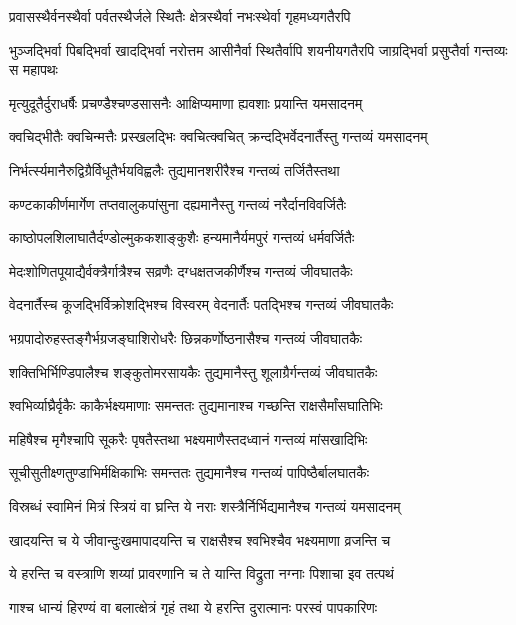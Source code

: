 \twolineshloka
{प्रवासस्थैर्वनस्थैर्वा पर्वतस्थैर्जले स्थितैः}
{क्षेत्रस्थैर्वा नभःस्थेर्वा गृहमध्यगतैरपि}


\threelineshloka
{भुञ्जद्भिर्वा पिबद्भिर्वा खादद्भिर्वा नरोत्तम}
{आसीनैर्वा स्थितैर्वापि शयनीयगतैरपि}
{जाग्रद्भिर्वा प्रसुप्तैर्वा गन्तव्यः स महापथः}


\twolineshloka
{मृत्युदूतैर्दुराधर्षैः प्रचण्डैश्चण्डसासनैः}
{आक्षिप्यमाणा ह्यवशाः प्रयान्ति यमसादनम्}


\twolineshloka
{क्वचिद्भीतैः क्वचिन्मत्तैः प्रस्खलद्भिः क्वचित्क्वचित्}
{क्रन्दद्भिर्वेदनार्तैस्तु गन्तव्यं यमसादनम्}


\twolineshloka
{निर्भर्त्स्यमानैरुद्विग्रैर्विधूतैर्भयविह्वलैः}
{तुद्यमानशरीरैश्च गन्तव्यं तर्जितैस्तथा}


\twolineshloka
{कण्टकाकीर्णमार्गेण तप्तवालुकपांसुना}
{दह्यमानैस्तु गन्तव्यं नरैर्दानविवर्जितैः}


\twolineshloka
{काष्ठोपलशिलाघातैर्दण्डोल्मुककशाङ्कुशैः}
{हन्यमानैर्यमपुरं गन्तव्यं धर्मवर्जितैः}


\twolineshloka
{मेदःशोणितपूयाद्यैर्वक्त्रैर्गात्रैश्च सव्रणैः}
{दग्धक्षतजकीर्णैश्च गन्तव्यं जीवघातकैः}


\twolineshloka
{वेदनार्तैस्च कूजद्भिर्विक्रोशद्भिश्च विस्वरम्}
{वेदनार्तैः पतद्भिश्च गन्तव्यं जीवघातकैः}


\twolineshloka
{भग्रपादोरुहस्तङ्गैर्भग्रजङ्घाशिरोधरैः}
{छिन्नकर्णोष्ठनासैश्च गन्तव्यं जीवघातकैः}


\twolineshloka
{शक्तिभिर्भिण्डिपालैश्च शङ्कुतोमरसायकैः}
{तुद्यमानैस्तु शूलाग्रैर्गन्तव्यं जीवघातकैः}


\twolineshloka
{श्वभिर्व्याघ्रैर्वृकैः काकैर्भक्ष्यमाणाः समन्ततः}
{तुद्यमानाश्च गच्छन्ति राक्षसैर्मांसघातिभिः}


\twolineshloka
{महिषैश्च मृगैश्चापि सूकरैः पृषतैस्तथा}
{भक्ष्यमाणैस्तदध्वानं गन्तव्यं मांसखादिभिः}


\twolineshloka
{सूचीसुतीक्ष्णतुण्डाभिर्मक्षिकाभिः समन्ततः}
{तुद्यमानैश्च गन्तव्यं पापिष्ठैर्बालघातकैः}


\twolineshloka
{विस्रब्धं स्वामिनं मित्रं स्त्रियं वा घ्रन्ति ये नराः}
{शस्त्रैर्निर्भिद्यमानैश्च गन्तव्यं यमसादनम्}


\twolineshloka
{खादयन्ति च ये जीवान्दुःखमापादयन्ति च}
{राक्षसैश्च श्वभिश्चैव भक्ष्यमाणा व्रजन्ति च}


\twolineshloka
{ये हरन्ति च वस्त्राणि शय्यां प्रावरणानि च}
{ते यान्ति विद्रुता नग्नाः पिशाचा इव तत्पथं}


\twolineshloka
{गाश्च धान्यं हिरण्यं वा बलात्क्षेत्रं गृहं तथा}
{ये हरन्ति दुरात्मानः परस्वं पापकारिणः}


